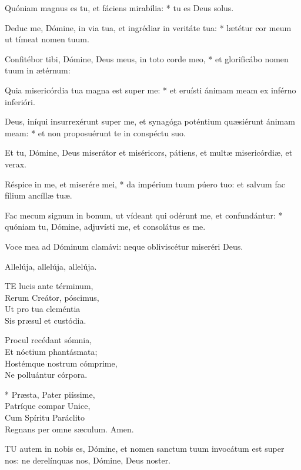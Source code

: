 Quóniam magnus es tu, et fáciens mirabília: * tu es Deus solus.

Deduc me, Dómine, in via tua, et ingrédiar in veritáte tua: * lætétur cor meum ut tímeat nomen tuum.

Confitébor tibi, Dómine, Deus meus, in toto corde meo, * et glorificábo nomen tuum in ætérnum:

Quia misericórdia tua magna est super me: * et eruísti ánimam meam ex inférno inferióri.

Deus, iníqui insurrexérunt super me, et synagóga poténtium quæsiérunt ánimam meam: * et non proposuérunt te in conspéctu suo.

Et tu, Dómine, Deus miserátor et miséricors, pátiens, et multæ misericórdiæ, et verax.

Réspice in me, et miserére mei, * da impérium tuum púero tuo: et salvum fac fílium ancíllæ tuæ.

Fac mecum signum in bonum, ut vídeant qui odérunt me, et confundántur: * quóniam tu, Dómine, adjuvísti me, et consolátus es me.


 Voce mea ad Dóminum clamávi: neque obliviscétur miseréri Deus.


 Allelúja, allelúja, allelúja.


\lettrine[lines=2]{T}{E} lucis ante términum,\\
Rerum Creátor, póscimus,\\
Ut pro tua cleméntia\\
Sis præsul et custódia.

Procul recédant sómnia,\\
Et nóctium phantásmata;\\
Hostémque nostrum cómprime,\\
Ne polluántur córpora.

* Præsta, Pater piíssime,\\
Patríque compar Unice,\\
Cum Spíritu Paráclito\\
Regnans per omne sæculum. Amen.


\lettrine[lines=2]{T}{U} autem in nobis es, Dómine, et nomen sanctum tuum invocátum est super nos: ne derelínquas nos, Dómine, Deus noster.

